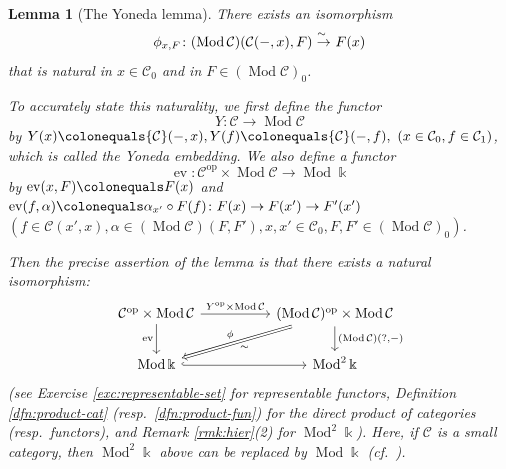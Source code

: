 \documentclass{surv-l}
\numberwithin{equation}{chapter}
\numberwithin{figure}{chapter}
\theoremstyle{plain}
\newtheorem{lem}[thm]{Lemma}
\theoremstyle{definition}
\theoremstyle{remark}
\newcommand{\isoto}{\
  \raise.8ex\hbox{$^{\sim}$}\kern-.7em\hbox{$\to$}\ }
\newcommand{\Ar}[3]{\ar[from={#1}, to={#2}, #3]}
\DeclareMathOperator{\Mod}{Mod}
\DeclareMathOperator{\ev}{ev}
\DeclareMathOperator{\blank}{-}
\begin{document}
\begin{lem}[The Yoneda lemma]\label{lem:Yoneda}
There exists an isomorphism
\[
\phi_{x,F}\colon (\Mod{\mathcal{C}})({\mathcal{C}}(\blank, x), F) \isoto F(x)
\]
that is natural in $x \in {\mathcal{C}}_0$ and in $F \in (\Mod{\mathcal{C}})_0$.

To accurately state this naturality, we first define the functor
\[
Y\colon {\mathcal{C}} \to \Mod{\mathcal{C}}
\]
by $Y(x)\colonequals  {\mathcal{C}}(\blank, x), Y(f)\colonequals  {\mathcal{C}}(\blank, f), \ (x \in {\mathcal{C}}_0, f \in {\mathcal{C}}_1)$,
which is called the \emph{Yoneda embedding}\index{Yoneda embedding}.
We also define a functor
\[
\ev\colon {\mathcal{C}}^{\mathrm{op}} \times \Mod{\mathcal{C}} \to \Mod\Bbbk
\]
by
$\ev(x, F)\colonequals  F(x)$ and $\ev(f, \alpha)\colonequals  \alpha_{x'} \circ F(f)\colon F(x) \to F(x') \to F'(x')$
\ $(f \in {\mathcal{C}}(x', x), \alpha \in (\Mod{\mathcal{C}})(F, F'), x, x' \in {\mathcal{C}}_0, F, F' \in (\Mod{\mathcal{C}})_0)$.

Then the precise assertion of the lemma is that there exists a natural isomorphism:
\[
\begin{tikzcd}[column sep=5em]
{\mathcal{C}}^{\mathrm{op}} \times \Mod{\mathcal{C}} & (\Mod{\mathcal{C}})^{\mathrm{op}} \times \Mod{\mathcal{C}}\\
\Mod\Bbbk & \Mod^2\Bbbk
\Ar{1-1}{1-2}{"Y^{\mathrm{op}}\times \Mod{\mathcal{C}}"}
\Ar{2-1}{2-2}{hook}
\Ar{1-1}{2-1}{"\ev"'}
\Ar{1-2}{2-2}{"(\Mod{\mathcal{C}})({?,\blank})"}
\Ar{1-2}{2-1}{Rightarrow, "\sim", "\phi"'}
\end{tikzcd}
\]
{\rm (see Exercise \ref{exc:representable-set} for representable functors,
Definition \ref{dfn:product-cat} (resp.\ \ref{dfn:product-fun})
for the direct product of categories (resp.\ functors), and
Remark \ref{rmk:hier}(2) for $\Mod^2 \Bbbk$).}
Here, if ${\mathcal{C}}$ is a small category, then
$\Mod^2\Bbbk$ above can be replaced by $\Mod\Bbbk$
{\rm (cf.\ \cite[Proposition 11]{Le18})}.
\end{lem}
\end{document}
